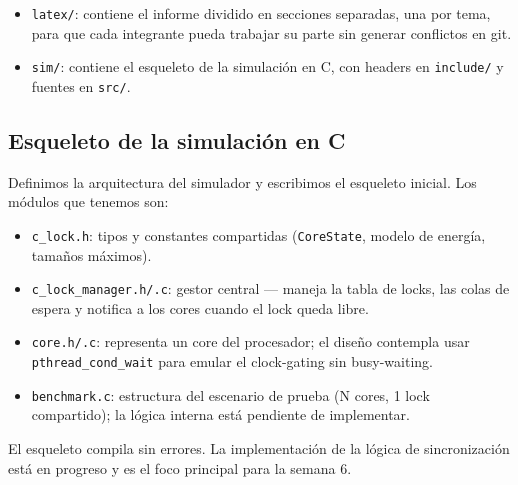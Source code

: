 \begin{itemize}
    \item \texttt{latex/}: contiene el informe dividido en secciones separadas,
          una por tema, para que cada integrante pueda trabajar su parte sin
          generar conflictos en git.
    \item \texttt{sim/}: contiene el esqueleto de la simulación en C, con
          headers en \texttt{include/} y fuentes en \texttt{src/}.
\end{itemize}

\subsection{Esqueleto de la simulación en C}

Definimos la arquitectura del simulador y escribimos el esqueleto inicial.
Los módulos que tenemos son:

\begin{itemize}
    \item \texttt{c\_lock.h}: tipos y constantes compartidas
          (\texttt{CoreState}, modelo de energía, tamaños máximos).
    \item \texttt{c\_lock\_manager.h/.c}: gestor central — maneja la tabla de
          locks, las colas de espera y notifica a los cores cuando el lock
          queda libre.
    \item \texttt{core.h/.c}: representa un core del procesador; el diseño
          contempla usar \texttt{pthread\_cond\_wait} para emular el clock-gating
          sin busy-waiting.
    \item \texttt{benchmark.c}: estructura del escenario de prueba (N cores,
          1 lock compartido); la lógica interna está pendiente de implementar.
\end{itemize}

El esqueleto compila sin errores. La implementación de la lógica de
sincronización está en progreso y es el foco principal para la semana 6.
